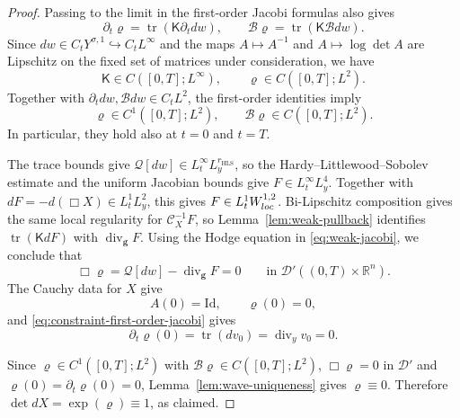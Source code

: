 \documentclass[10pt,a4paper]{amsart}
\DeclareMathOperator{\Div}{div}
\newcommand{\Kmat}{\mathsf K}
\newcommand{\Real}{\mathbb R}
\newcommand{\Rn}{\Real^n}
\newcommand{\gmetric}{\mathbf g}
\DeclareMathOperator{\tr}{tr}
\begin{document}
\begin{proof}
Passing to the limit in the first-order Jacobi formulas also gives
\begin{equation}\label{eq:constraint-first-order-jacobi}
 \partial_t\varrho
 =\tr(\Kmat\partial_tdw),
 \qquad
 \mathcal B\varrho
 =\tr(\Kmat\mathcal Bdw).
\end{equation}
Since $dw\in C_tY^{\sigma,1}\hookrightarrow C_tL^\infty$ and the maps
$A\mapsto A^{-1}$ and $A\mapsto\log\det A$ are Lipschitz on the fixed set of
matrices under consideration, we have
\[
 \Kmat\in C([0,T];L^\infty),
 \qquad
 \varrho\in C([0,T];L^2).
\]
Together with $\partial_tdw,\mathcal Bdw\in C_tL^2$, the first-order
identities imply
\[
 \varrho\in C^1([0,T];L^2),
 \qquad
 \mathcal B\varrho\in C([0,T];L^2).
\]
In particular, they hold also at $t=0$ and $t=T$.

The trace bounds give
$\mathcal Q[dw]\in L^\infty_tL^{r_{\mathrm{HLS}}}_y$, so the
Hardy--Littlewood--Sobolev estimate and the uniform Jacobian bounds give
$F\in L^\infty_tL^4_y$. Together with
$dF=-d(\Box X)\in L^1_tL^2_y$, this gives
$F\in L^1_tW^{1,2}_{\rm loc}$. Bi-Lipschitz composition gives the same local
regularity for $\mathcal C_X^{-1}F$, so Lemma~\ref{lem:weak-pullback}
identifies $\tr(\Kmat dF)$ with $\Div_{\gmetric}F$. Using the Hodge equation
in \eqref{eq:weak-jacobi}, we conclude that
\[
 \Box\varrho
 =\mathcal Q[dw]-\Div_{\gmetric}F
 =0
 \qquad\text{in }\mathcal D'((0,T)\times\Rn).
\]
The Cauchy data for $X$ give
\[
 A(0)=\mathrm{Id},
 \qquad
 \varrho(0)=0,
\]
and \eqref{eq:constraint-first-order-jacobi} gives
\[
 \partial_t\varrho(0)
 =\tr(dv_0)
 =\Div_yv_0
 =0.
\]

Since $\varrho\in C^1([0,T];L^2)$ with $\mathcal B\varrho\in C([0,T];L^2)$,
$\Box\varrho=0$ in $\mathcal D'$ and $\varrho(0)=\partial_t\varrho(0)=0$,
Lemma~\ref{lem:wave-uniqueness} gives $\varrho\equiv0$.
Therefore $\det dX=\exp(\varrho)\equiv1$, as claimed.
\end{proof}
\end{document}
